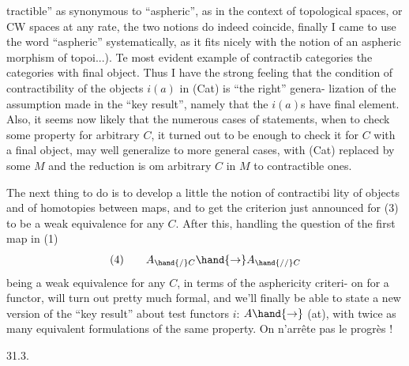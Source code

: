 tractible'' as synonymous to ``aspheric'', as  in the context of
topological spaces, or CW spaces at any rate, the two notions do indeed
coincide, finally I came to use  the word ``aspheric'' systematically, as it
fits nicely with the notion of an aspheric morphism of topoi...). Te
most evident example  of contractib categories   the categories
with final object. Thus I have the strong feeling that the condition of
contractibility of the  objects $i(a)$ in (Cat) is ``the right'' genera-%
lization of the  assumption made in the ``key result'', namely
that the $i(a)$s have final element. Also, it seems now likely that the
numerous cases of statements, when to check some property for arbitrary
$C$, it turned out to be enough to check it for  $C$ with a final
object, may well generalize to more general cases, with (Cat) replaced
by some $M$ and the reduction is om arbitrary $C$ in $M$ to contractible ones.

The next thing to do is to develop a little the notion of contractibi%
lity of objects and of homotopies between maps, and to get the criterion
just announced for (3) to be a weak equivalence for any $C$. After this,
handling the question of the first map in (1)
\[ \text{(4)} \qquad A_{\hand{/}C} \hand{\to} A_{\hand{//}C} \]
being a weak equivalence for any $C$, in terms of the asphericity criteri-%
on for a functor, will turn out pretty much formal, and we'll finally
be able to state a new version of the ``key result'' about test functors
$i$: $A \hand{\to}$ (at), with  twice as many equivalent formulations of the same
property. On n'arrête pas le progrès !

31.3.

